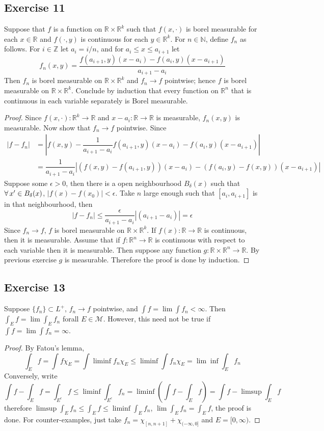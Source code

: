 \subsection*{Exercise 11}
Suppose that $f$ is a function on $\mathbb{R}\times\mathbb{R}^k$ such that $f(x,\cdot)$ is borel measurable for each $x\in\mathbb{R}$ and $f(\cdot,y)$ is continuous for each $y\in\mathbb{R}^k$. For $n\in\mathbb{N}$, define $f_n$ as follows. For $i\in\mathbb{Z}$ let $a_i=i/n$, and for $a_i\le x\le a_{i+1}$ let
$$
f_n(x,y)=\dfrac{f(a_{i+1},y)(x-a_i)-f(a_i,y)(x-a_{i+1})}{a_{i+1}-a_i}
$$
Then $f_n$ is borel measurable on $\mathbb{R}\times\mathbb{R}^k$ and $f_n\to f$ pointwise; hence $f$ is borel measurable on $\mathbb{R}\times\mathbb{R}^k$. Conclude by induction that every function on $\mathbb{R}^n$ that is continuous in each variable separately is Borel measurable.
\begin{proof}
    Since $f(x,\cdot):\mathbb{R}^k\to\mathbb{R}$ and $x-a_i:\mathbb{R}\to\mathbb{R}$ is measurable, $f_n(x,y)$ is measurable. Now show that $f_n\to f$ pointwise. Since
    \begin{align*}
        |f-f_n|&=|f(x,y)-\dfrac{1}{a_{i+1}-a_i}f(a_{i+1},y)(x-a_i)-f(a_i,y)(x-a_{i+1})|\\
        &=\dfrac{1}{a_{i+1}-a_i}|(f(x,y)-f(a_{i+1},y))(x-a_{i})-(f(a_i,y)-f(x,y))(x-a_{i+1})|
    \end{align*}
    Suppose some $\epsilon>0$, then there is a open neighbourhood $B_\delta(x)$ such that $\forall\, x'\in B_\delta(x)$, $|f(x)-f(x_0)|<\epsilon$. Take $n$ large enough such that $[a_i,a_{i+1}]$ is in that neighbourhood, then
    $$
    |f-f_n|\le\dfrac{\epsilon}{a_{i+1}-a_i}|(a_{i+1}-a_i)|=\epsilon
    $$
    Since $f_n\to f$, $f$ is borel measurable on $\mathbb{R}\times\mathbb{R}^k$. If $f(x):\mathbb{R}\to\mathbb{R}$ is continuous, then it is measurable. Assume that if $f:\mathbb{R}^n\to\mathbb{R}$ is continuous with respect to each variable then it is measurable. Then suppose any function $g:\mathbb{R}\times\mathbb{R}^n\to\mathbb{R}$. By previous exercise $g$ is measurable. Therefore the proof is done by induction.
\end{proof}
\subsection*{Exercise 13}
Suppose $\{f_n\}\subset L^+$, $f_n\to f$ pointwise, and $\int f=\lim\int f_n<\infty$. Then $\int_E f=\lim\int_E f_n$ forall $E\in\mathcal{M}$. However, this need not be true if $\int f=\lim\int f_n=\infty$.
\begin{proof}
    By Fatou's lemma,
    $$
    \int_Ef=\int f\chi_E=\int\liminf f_n\chi_E\le\liminf\int f_n\chi_E=\lim\inf\int_Ef_n
    $$
    Conversely, write
    $$
    \int f-\int_E f=\int_{E^c} f\le\liminf\int_{E^c}f_n=\liminf(\int f-\int_E f)=\int f-\limsup\int_E f
    $$
    therefore $\limsup\int_Ef_n\le\int_E f\le\liminf\int_Ef_n$, $\lim\int_Ef_n=\int_Ef$,
    the proof is done. For counter-examples, just take $f_n=\chi_{[n,n+1]}+\chi_{(-\infty,0]}$ and $E=[0,\infty)$.
\end{proof}
